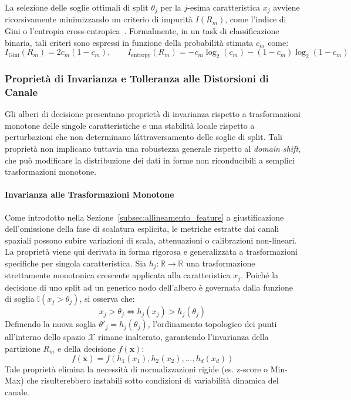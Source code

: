 La selezione delle soglie ottimali di split $\theta_j$ per la $j$-esima caratteristica $x_j$ avviene ricorsivamente minimizzando un criterio di impurità $I(R_m)$, come l'indice di Gini o l'entropia cross-entropica~\cite{breiman1984}. Formalmente, in un task di classificazione binaria, tali criteri sono espressi in funzione della probabilità stimata $c_m$ come:
\begin{equation}
    I_{\text{Gini}}(R_m) = 2c_m(1-c_m), \qquad I_{\text{entropy}}(R_m) = -c_m\log_2(c_m) - (1-c_m)\log_2(1-c_m)
\end{equation}

\subsubsection{Proprietà di Invarianza e Tolleranza alle Distorsioni di Canale}
Gli alberi di decisione presentano proprietà di invarianza rispetto a trasformazioni monotone delle singole caratteristiche e una stabilità locale rispetto a perturbazioni che non determinano l\'attraversamento delle soglie di split. Tali proprietà non implicano tuttavia una robustezza generale rispetto al \textit{domain shift}, che può modificare la distribuzione dei dati in forme non riconducibili a semplici trasformazioni monotone.

\paragraph{Invarianza alle Trasformazioni Monotone}
Come introdotto nella Sezione~\ref{subsec:allineamento_feature} a giustificazione dell'omissione della fase di scalatura esplicita, le metriche estratte dai canali spaziali possono subire variazioni di scala, attenuazioni o calibrazioni non-lineari. La proprietà viene qui derivata in forma rigorosa e generalizzata a trasformazioni specifiche per singola caratteristica. Sia $h_j: \mathbb{R} \to \mathbb{R}$ una trasformazione strettamente monotonica crescente applicata alla caratteristica $x_j$. Poiché la decisione di uno split ad un generico nodo dell'albero è governata dalla funzione di soglia $\mathbb{I}(x_j > \theta_j)$, si osserva che:
\begin{equation}
    x_j > \theta_j \iff h_j(x_j) > h_j(\theta_j)
\end{equation}
Definendo la nuova soglia $\theta'_j = h_j(\theta_j)$, l'ordinamento topologico dei punti all'interno dello spazio $\mathcal{X}$ rimane inalterato, garantendo l'invarianza della partizione $R_m$ e della decisione $f(\mathbf{x})$:
\begin{equation}
    f(\mathbf{x}) = f(h_1(x_1), h_2(x_2), \dots, h_d(x_d))
\end{equation}
Tale proprietà elimina la necessità di normalizzazioni rigide (es. z-score o Min-Max) che risulterebbero instabili sotto condizioni di variabilità dinamica del canale.

